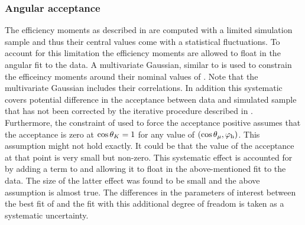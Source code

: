 \subsubsection{Angular acceptance}
\label{systAngAcc}
The efficiency moments as described in  are computed with a limited simulation sample
and thus their central values come with a statistical fluctuations. To account for this limitation the
efficiency moments are allowed to float in the angular fit to the data. A multivariate Gaussian, similar to 
is used to constrain the efficeincy moments around their nominal values of .
Note that the multivariate Gaussian includes their correlations. In addition this systematic covers
potential difference in the acceptance between data and simulated sample
that has not been corrected by the iterative procedure described in . Furthermore,
the constraint of  used to force the acceptance positive assumes that the acceptance is zero
at $\cos\theta_{K}=1$ for any value of $(\cos\theta_{\mu},\varphi_{\text h})$. This assumption might not hold exactly. It could be
that the value of the acceptance at that point is very small but non-zero. This systematic effect is accounted for
by adding a term to  and allowing it to float in the above-mentioned fit to the data.
The size of the latter effect was found to be small and the above assumption is almost true. The differences
in the parameters of interest between the best fit of  and the fit with this additional
degree of freadom is taken as a systematic uncertainty.

